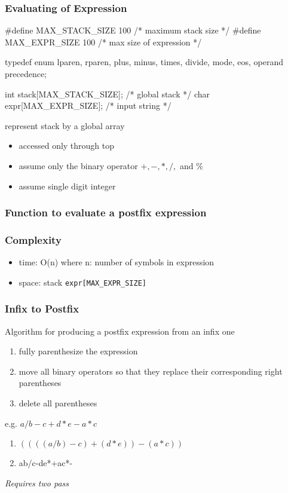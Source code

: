 \documentclass[newPxFont,sthlmFooter,nooffset]{beamer}
\begin{document}
\begin{frame}[t, fragile]
  \frametitle{Evaluating of Expression}
\begin{ncodedef}
#define MAX_STACK_SIZE 100 /* maximum stack size */
#define MAX_EXPR_SIZE 100  /* max size of expression */

typedef enum {lparen, rparen, 
              plus, minus, 
              times, divide, 
              mode, eos, operand
             } precedence;  

int stack[MAX_STACK_SIZE]; /* global stack */
char expr[MAX_EXPR_SIZE];  /* input string */
\end{ncodedef}

represent stack by a global array
\begin{itemize}
\item accessed only through top
\item assume only the binary operator $+, -, *, /,$ and $\%$
\item assume single digit integer
\end{itemize}
\end{frame}

\begin{frame}
   \frametitle{Function to evaluate a postfix expression}
  
\end{frame}



\begin{frame}[t]
  \frametitle{Complexity}
  \begin{itemize}
  \item time: O(n) where n: number of symbols in expression
  \item space: stack \texttt{expr[MAX\_EXPR\_SIZE]}
  \end{itemize}
\end{frame}


\begin{frame}[t]
  \frametitle{Infix to Postfix}
Algorithm for producing a postfix expression from an infix one
\begin{enumerate}
\item fully parenthesize the expression
\item move all binary operators so that they replace their corresponding right parentheses
\item delete all parentheses
\end{enumerate}

e.g. $a/b-c+d*e-a*c$
\begin{enumerate}
\item $((((a/b)-c)+(d*e))-(a*c))$
\item ab/c-de*+ac*-
\end{enumerate}
\textit{Requires two pass}
\end{frame}
\end{document}

